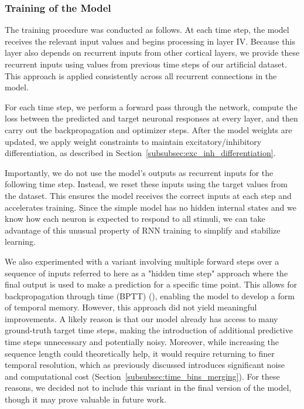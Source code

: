 \subsubsection{Training of the Model}
\label{subsubsec:training_model}

The training procedure was conducted as follows. At each time step, the model receives the relevant input values and begins processing in layer IV. Because this layer also depends on recurrent inputs from other cortical layers, we provide these recurrent inputs using values from previous time steps of our artificial dataset. This approach is applied consistently across all recurrent connections in the model.

For each time step, we perform a forward pass through the network, compute the loss between the predicted and target neuronal responses at every layer, and then carry out the backpropagation and optimizer steps. After the model weights are updated, we apply weight constraints to maintain excitatory/inhibitory differentiation, as described in Section~\ref{subsubsec:exc_inh_differentiation}.

Importantly, we do not use the model's outputs as recurrent inputs for the following time step. Instead, we reset these inputs using the target values from the dataset. This ensures the model receives the correct inputs at each step and accelerates training. Since the simple model has no hidden internal states and we know how each neuron is expected to respond to all stimuli, we can take advantage of this unusual property of RNN training to simplify and stabilize learning.

We also experimented with a variant involving multiple forward steps over a sequence of inputs referred to here as a "hidden time step" approach where the final output is used to make a prediction for a specific time point. This allows for backpropagation through time (BPTT) (\citet{webos1990btt}), enabling the model to develop a form of temporal memory. However, this approach did not yield meaningful improvements. A likely reason is that our model already has access to many ground-truth target time steps, making the introduction of additional predictive time steps unnecessary and potentially noisy. Moreover, while increasing the sequence length could theoretically help, it would require returning to finer temporal resolution, which as previously discussed introduces significant noise and computational cost (Section~\ref{subsubsec:time_bins_merging}). For these reasons, we decided not to include this variant in the final version of the model, though it may prove valuable in future work.


